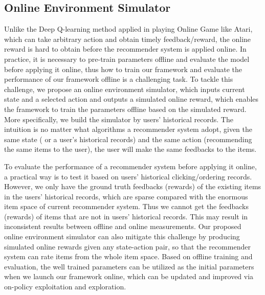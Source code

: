 \subsection{Online Environment Simulator}
Unlike the Deep Q-learning method applied in playing Online Game like Atari, which can take arbitrary action and obtain timely feedback/reward, the online reward is hard to obtain before the recommender system is applied online. In practice, it is necessary to pre-train parameters offline and evaluate the model before applying it online, thus how to train our framework and evaluate the performance of our framework offline is a challenging task. To tackle this challenge, we propose an online environment simulator, which inputs current state and a selected action and outputs a simulated online reward, which enables the framework to train the parameters offline based on the simulated reward. More specifically, we build the simulator by users' historical records. The intuition is no matter what algorithms a recommender system adopt, given the same state ( or a user's historical records) and the same action (recommending the same items to the user), the user will make the same feedbacks to the items.

To evaluate the performance of a recommender system before applying it online, a practical way is to test it based on users' historical clicking/ordering records. However, we only have the ground truth feedbacks (rewards) of the existing items in the users' historical records, which are sparse compared with the enormous item space of current recommender system. Thus we cannot get the feedbacks (rewards) of items that are not in users' historical records. This may result in inconsistent results between offline and online measurements. Our proposed online environment simulator can also mitigate this challenge by producing simulated online rewards given any state-action pair, so that the recommender system can rate items from the whole item space. Based on offline training and evaluation, the well trained parameters can be utilized as the initial parameters when we launch our framework online, which can be updated and improved via on-policy exploitation and exploration.


